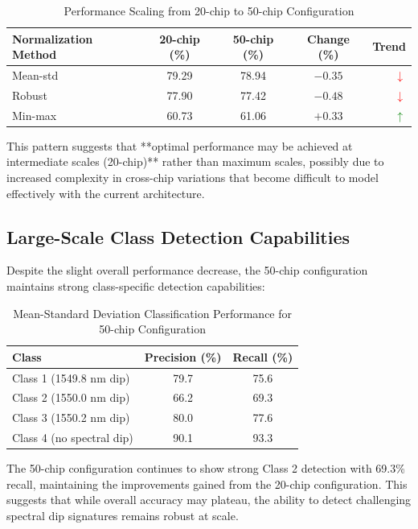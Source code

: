 \begin{table}[htbp]
\centering
\caption{Performance Scaling from 20-chip to 50-chip Configuration}
\label{tab:scaling_performance}
\begin{tabular}{lcccr}
\toprule
\textbf{Normalization Method} & \textbf{20-chip (\%)} & \textbf{50-chip (\%)} & \textbf{Change (\%)} & \textbf{Trend} \\
\midrule
Mean-std & 79.29 & 78.94 & $-0.35$ & \textcolor{red}{$\downarrow$} \\
Robust & 77.90 & 77.42 & $-0.48$ & \textcolor{red}{$\downarrow$} \\
Min-max & 60.73 & 61.06 & $+0.33$ & \textcolor{green}{$\uparrow$} \\
\bottomrule
\end{tabular}
\end{table}

This pattern suggests that **optimal performance may be achieved at intermediate scales (20-chip)** rather than maximum scales, possibly due to increased complexity in cross-chip variations that become difficult to model effectively with the current architecture.

\subsection{Large-Scale Class Detection Capabilities}

Despite the slight overall performance decrease, the 50-chip configuration maintains strong class-specific detection capabilities:

\begin{table}[htbp]
\centering
\caption{Mean-Standard Deviation Classification Performance for 50-chip Configuration}
\label{tab:performance_50chip_meanstd}
\begin{tabular}{lcc}
\toprule
\textbf{Class} & \textbf{Precision (\%)} & \textbf{Recall (\%)} \\
\midrule
Class 1 (1549.8 nm dip) & 79.7 & 75.6 \\
Class 2 (1550.0 nm dip) & 66.2 & 69.3 \\
Class 3 (1550.2 nm dip) & 80.0 & 77.6 \\
Class 4 (no spectral dip) & 90.1 & 93.3 \\
\bottomrule
\end{tabular}
\end{table}

The 50-chip configuration continues to show strong Class 2 detection with 69.3\% recall, maintaining the improvements gained from the 20-chip configuration. This suggests that while overall accuracy may plateau, the ability to detect challenging spectral dip signatures remains robust at scale.


